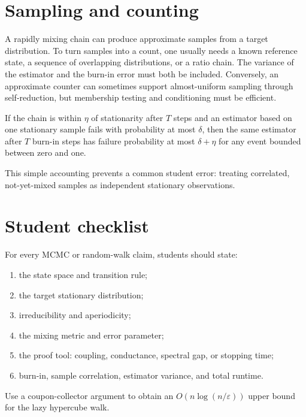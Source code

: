 \section{Sampling and counting}

A rapidly mixing chain can produce approximate samples from a target
distribution.  To turn samples into a count, one usually needs a known
reference state, a sequence of overlapping distributions, or a ratio chain.
The variance of the estimator and the burn-in error must both be included.
Conversely, an approximate counter can sometimes support almost-uniform
sampling through self-reduction, but membership testing and conditioning must
be efficient.

\begin{proposition}
If the chain is within $\eta$ of stationarity after $T$ steps and an estimator
based on one stationary sample fails with probability at most $\delta$, then
the same estimator after $T$ burn-in steps has failure probability at most
$\delta+\eta$ for any event bounded between zero and one.
\end{proposition}

This simple accounting prevents a common student error: treating correlated,
not-yet-mixed samples as independent stationary observations.

\section{Student checklist}

For every MCMC or random-walk claim, students should state:

\begin{enumerate}
\item the state space and transition rule;
\item the target stationary distribution;
\item irreducibility and aperiodicity;
\item the mixing metric and error parameter;
\item the proof tool: coupling, conductance, spectral gap, or stopping time;
\item burn-in, sample correlation, estimator variance, and total runtime.
\end{enumerate}

\begin{problem}
Use a coupon-collector argument to obtain an $O(n\log(n/\varepsilon))$
upper bound for the lazy hypercube walk.
\end{problem}

